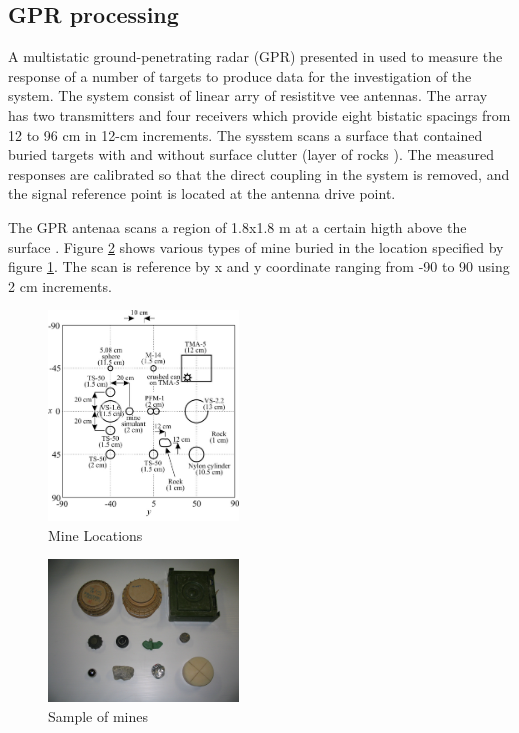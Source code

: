 \documentclass[conference]{IEEEtran}
\begin{document}
\subsection{GPR processing}

A multistatic ground-penetrating radar (GPR) presented in \cite{Counts2007} used to measure the response of a
number of targets to produce data for the investigation of  the system. The system consist of linear arry of resistitve vee antennas. The array has two transmitters and four receivers which provide eight bistatic spacings from 12 to 96 cm in 12-cm increments. The sysstem scans a surface that contained buried targets with and without surface clutter (layer of rocks ).  The measured responses are calibrated so that the direct coupling in the system is removed, and the signal reference point is located at the antenna drive point.

The GPR antenaa scans a region of  1.8x1.8 m  at a certain higth above the surface \cite{Counts2007}. Figure \ref{fig:mineshapes} shows various types of mine buried in the location specified by figure \ref{fig:minloc}. The scan is reference by x and y coordinate ranging from -90 to 90 using 2 cm increments.

 \begin{figure}
\centering
\label{fig:minloc}
\includegraphics[width=0.45\textwidth]{images/MineLocations.jpg}
 \caption{Mine Locations}
\end{figure}

 \begin{figure}
\centering
\label{fig:mineshapes}
\includegraphics[width=0.45\textwidth]{images/MineShapes.jpg}
 \caption{ Sample of mines  }
\end{figure}
\end{document}
